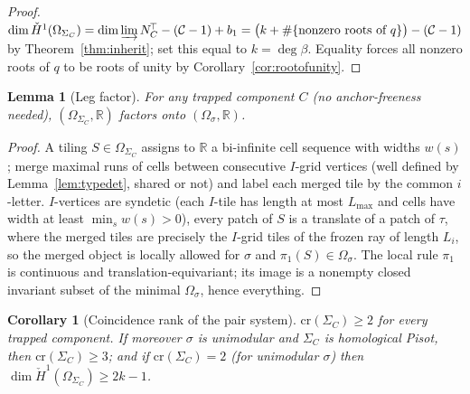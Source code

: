 \documentclass[11pt]{article}
\newtheorem{lemma}[theorem]{Lemma}
\newtheorem{corollary}[theorem]{Corollary}
\begin{document}
\begin{proof}
$\dim\check H^1(\Omega_{\Sigma_C})
=\dim\varinjlim N_C^{\!\top}-(\mathcal C-1)+b_1
=\bigl(k+\#\{\text{nonzero roots of }q\}\bigr)-(\mathcal C-1)$ by
Theorem~\ref{thm:inherit}; set this equal to $k=\deg\beta$. Equality
forces all nonzero roots of $q$ to be roots of unity by
Corollary~\ref{cor:rootofunity}.
\end{proof}

\begin{lemma}[Leg factor]\label{lem:legfactor}
For any trapped component $C$ (no anchor-freeness needed),
$(\Omega_{\Sigma_C},\mathbb R)$ factors onto $(\Omega_\sigma,\mathbb
R)$.
\end{lemma}

\begin{proof}
A tiling $S\in\Omega_{\Sigma_C}$ assigns to $\mathbb R$ a bi-infinite
cell sequence with widths $w(s)$; merge maximal runs of cells between
consecutive $I$-grid vertices (well defined by
Lemma~\ref{lem:typedet}, shared or not) and label each merged tile by
the common $i$-letter. $I$-vertices are syndetic (each $I$-tile has
length at most $L_{\max}$ and cells have width at least $\min_s
w(s)>0$), every patch of $S$ is a translate of a patch of $\tau$,
where the merged tiles are precisely the $I$-grid tiles of the frozen
ray of length $L_{i}$, so the merged object is locally allowed for
$\sigma$ and $\pi_1(S)\in\Omega_\sigma$. The local rule $\pi_1$ is
continuous and translation-equivariant; its image is a nonempty closed
invariant subset of the minimal $\Omega_\sigma$, hence everything.
\end{proof}

\begin{corollary}[Coincidence rank of the pair system]\label{cor:cr}
$\mathrm{cr}(\Sigma_C)\ge2$ for every trapped component. If moreover
$\sigma$ is unimodular and $\Sigma_C$ is homological Pisot, then
$\mathrm{cr}(\Sigma_C)\ge3$; and if $\mathrm{cr}(\Sigma_C)=2$ (for
unimodular $\sigma$) then $\dim\check H^1(\Omega_{\Sigma_C})\ge2k-1$.
\end{corollary}
\end{document}

